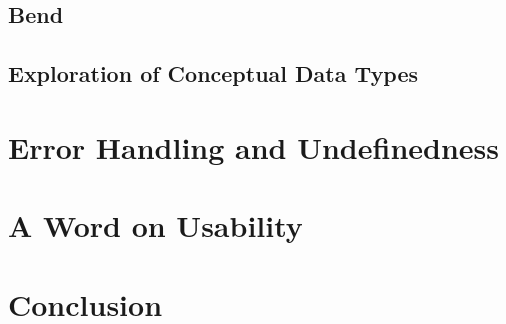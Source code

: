 \documentclass{article}
\begin{document}
\subsection{Bend} %
\subsection{Exploration of Conceptual Data Types}
\section{Error Handling and Undefinedness}
\section{A Word on Usability}
\section{Conclusion}


\nocite{*} %
\printbibliography %
\end{document}
